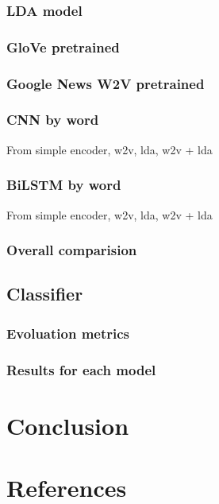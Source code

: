 \documentclass[11pt]{article}
\begin{document}
\subsubsection{LDA model}


\subsubsection{GloVe pretrained}

\subsubsection{Google News W2V pretrained}

\subsubsection{CNN by word}

From simple encoder, w2v, lda, w2v + lda

\subsubsection{BiLSTM by word}

From simple encoder, w2v, lda, w2v + lda

\subsubsection{Overall comparision}

\subsection{Classifier}
\subsubsection{Evoluation metrics}
\subsubsection{Results for each model}


\section{Conclusion}


\section{References}


\end{document}

